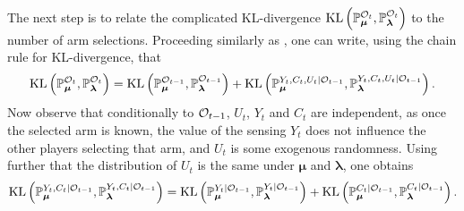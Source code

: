 The next step is to relate the complicated KL-divergence $\mathrm{KL}\left(\mathbb{P}_{\bm{\mu}}^{\mathcal{O}_t},\mathbb{P}_{\bm{\lambda}}^{\mathcal{O}_t}\right)$ to the number of arm selections.
Proceeding similarly as \cite{Garivier16TrueShape}, one can write, using the chain rule for KL-divergence, that
\begin{equation}\label{eq:5:Iterative}\mathrm{KL}\left(\mathbb{P}_{\bm{\mu}}^{\mathcal{O}_{t}},\mathbb{P}_{\bm{\lambda}}^{\mathcal{O}_{t}}\right) =  \mathrm{KL}\left(\mathbb{P}_{\bm{\mu}}^{\mathcal{O}_{t-1}},\mathbb{P}_{\bm{\lambda}}^{\mathcal{O}_{t-1}}\right) + \mathrm{KL}\left(\mathbb{P}_{\bm{\mu}}^{Y_{t},C_t,U_t | \mathcal{O}_{t-1}},\mathbb{P}_{\bm{\lambda}}^{Y_{t},C_t,U_t | \mathcal{O}_{t-1}}\right).\end{equation}
Now observe that conditionally to $\mathcal{O}_{t-1}$, $U_t$, $Y_t$ and $C_t$ are independent, as once the selected arm is known, the value of the sensing $Y_t$ does not influence the other players selecting that arm, and $U_t$ is some exogenous randomness.
Using further that the distribution of $U_t$ is the same under $\bm{\mu}$ and $\bm{\lambda}$, one obtains
\begin{equation}\mathrm{KL}\left(\mathbb{P}_{\bm{\mu}}^{Y_{t},C_t | \mathcal{O}_{t-1}},\mathbb{P}_{\bm{\lambda}}^{Y_{t},C_t | \mathcal{O}_{t-1}}\right) =
 \mathrm{KL}\left(\mathbb{P}_{\bm{\mu}}^{Y_{t}| \mathcal{O}_{t-1}},\mathbb{P}_{\bm{\lambda}}^{Y_{t}| \mathcal{O}_{t-1}}\right) + \mathrm{KL}\left(\mathbb{P}_{\bm{\mu}}^{C_t | \mathcal{O}_{t-1}},\mathbb{P}_{\bm{\lambda}}^{C_t | \mathcal{O}_{t-1}}\right).\label{eq:5:DecKL}
\end{equation}

